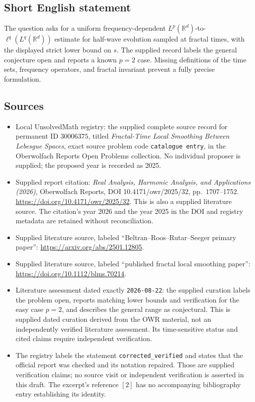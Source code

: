 \documentclass[11pt]{article}
\newcommand{\R}{\mathbb{R}}
\begin{document}
\subsection{Short English statement}
The question asks for a uniform frequency-dependent \(L^p(\R^d)\)-to-\(\ell^q(L^q(\R^d))\) estimate for half-wave evolution sampled at fractal times, with the displayed strict lower bound on \(s\). The supplied record labels the general conjecture open and reports a known \(p=2\) case. Missing definitions of the time sets, frequency operators, and fractal invariant prevent a fully precise formulation.
\subsection{Sources}
\begin{itemize}
\item Local UnsolvedMath registry: the supplied complete source record for permanent ID \(30006375\), titled \emph{Fractal-Time Local Smoothing Between Lebesgue Spaces}, exact source problem code \texttt{catalogue entry}, in the Oberwolfach Reports Open Problems collection. No individual proposer is supplied; the proposed year is recorded as 2025.
\item Supplied report citation: \emph{Real Analysis, Harmonic Analysis, and Applications (2026)}, Oberwolfach Reports, DOI 10.4171/owr/2025/32, pp.\ 1707--1752. \url{https://doi.org/10.4171/owr/2025/32}. This is also a supplied literature source. The citation's year 2026 and the year 2025 in the DOI and registry metadata are retained without reconciliation.
\item Supplied literature source, labeled ``Beltran--Roos--Rutar--Seeger primary paper'': \url{https://arxiv.org/abs/2501.12805}.
\item Supplied literature source, labeled ``published fractal local smoothing paper'': \url{https://doi.org/10.1112/blms.70214}.
\item Literature assessment dated exactly \texttt{2026-08-22}: the supplied curation labels the problem open, reports matching lower bounds and verification for the easy case \(p=2\), and describes the general range as conjectural. This is supplied dated curation derived from the OWR material, not an independently verified literature assessment. Its time-sensitive status and cited claims require independent verification.
\item The registry labels the statement \texttt{corrected\_verified} and states that the official report was checked and its notation repaired. Those are supplied verification claims; no source visit or independent verification is asserted in this draft. The excerpt's reference \([2]\) has no accompanying bibliography entry establishing its identity.
\end{itemize}
\end{document}
